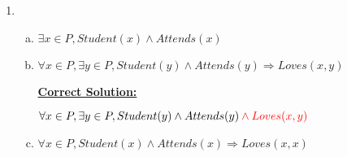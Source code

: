 \documentclass[12pt]{article}
\begin{document}
\begin{enumerate}[1.]
\begin{enumerate}[a)]
    \end{enumerate}

    \item

    \begin{enumerate}[a)]
        \item $\exists x \in P, Student(x) \land Attends(x)$
        \item $\forall x \in P, \exists y \in P, Student(y) \land Attends(y) \Rightarrow Loves(x,y)$

        \bigskip

        \begin{mdframed}
            \underline{\textbf{Correct Solution:}}

            \bigskip

            $\forall x \in P, \exists y \in P, Student(y) \land Attends(y) \color{red} \land Loves(x,y)$
        \end{mdframed}

        \item $\forall x \in P, Student(x) \land Attends(x) \Rightarrow Loves(x,x)$
    \end{enumerate}
\end{enumerate}
\end{document}
